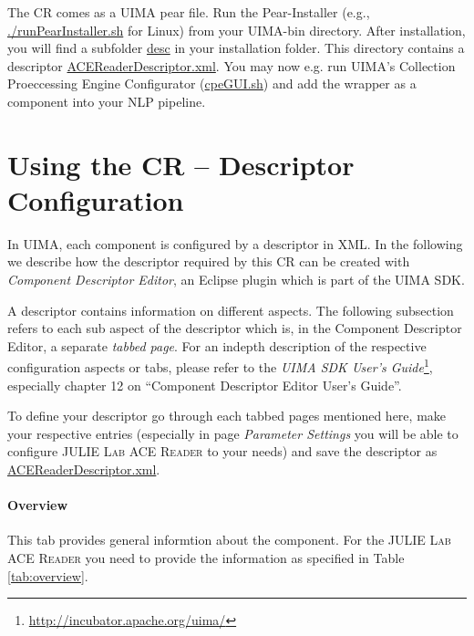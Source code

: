 \documentclass[11pt,a4paper,halfparskip]{scrartcl}
\begin{document}
The CR comes as a UIMA pear file. Run the Pear-Installer (e.g.,
\url{./runPearInstaller.sh} for Linux) from your UIMA-bin directory.
After installation, you will find a subfolder \url{desc} in your
installation folder. This directory contains a descriptor
\url{ACEReaderDescriptor.xml}. You may now e.g. run UIMA's
Collection Proeccessing Engine Configurator (\url{cpeGUI.sh}) and add
the wrapper as a component into your NLP pipeline.






\section{Using the CR -- Descriptor Configuration}

In UIMA, each component is configured by a descriptor in XML. In the
following we describe how the descriptor required by this CR can be
created with \emph{Component Descriptor Editor}, an Eclipse plugin
which is part of the UIMA SDK.

A descriptor contains information on different aspects. The following
subsection refers to each sub aspect of the descriptor which is, in
the Component Descriptor Editor, a separate \emph{tabbed page}. For an
indepth description of the respective configuration aspects or tabs,
please refer to the \emph{UIMA SDK User's
  Guide}\footnote{\url{http://incubator.apache.org/uima/}}, especially
chapter 12 on ``Component Descriptor Editor User's Guide''.

To define your descriptor go through each tabbed pages mentioned
here, make your respective entries (especially in page \emph{Parameter
Settings} you will be able to configure \textsc{JULIE Lab ACE Reader} 
to your needs) and save the descriptor as \url{ACEReaderDescriptor.xml}.

\paragraph{Overview}
This tab provides general informtion about the component. For the 
\textsc{JULIE Lab ACE Reader}  you need to provide the information as
specified in Table
\ref{tab:overview}.
\end{document}
